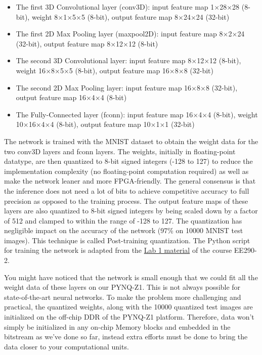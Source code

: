 \documentclass[11pt]{article}
\begin{document}
\begin{itemize}
\item The first 3D Convolutional layer (conv3D): input feature map 1$\times$28$\times$28 (8-bit), weight 8$\times$1$\times$5$\times$5 (8-bit), output feature map 8$\times$24$\times$24 (32-bit)
\item The first 2D Max Pooling layer (maxpool2D): input feature map 8$\times$2$\times$24 (32-bit), output feature map 8$\times$12$\times$12 (8-bit)
\item The second 3D Convolutional layer: input feature map 8$\times$12$\times$12 (8-bit), weight 16$\times$8$\times$5$\times$5 (8-bit), output feature map 16$\times$8$\times$8 (32-bit)
\item The second 2D Max Pooling layer: input feature map 16$\times$8$\times$8 (32-bit), output feature map 16$\times$4$\times$4 (8-bit)
\item The Fully-Connected layer (fconn): input feature map 16$\times$4$\times$4 (8-bit), weight 10$\times$16$\times$4$\times$4 (8-bit), output feature map 10$\times$1$\times$1 (32-bit)
\end{itemize}

The network is trained with the MNIST dataset to obtain the weight data for the two conv3D layers and fconn layers. The weights, initially in floating-point datatype, are then quantized to 8-bit signed integers (-128 to 127) to reduce the implementation complexity (no floating-point computation required) as well as make the network leaner and more FPGA-friendly. The general consensus is that the inference does not need a lot of bits to achieve competitive accuracy to full precision as opposed to the training process. The output feature maps of these layers are also quantized to 8-bit signed integers by being scaled down by a factor of 512 and clamped to within the range of -128 to 127. The quantization has negligible impact on the accuracy of the network (97\% on 10000 MNIST test images). This technique is called Post-training quantization. The Python script for training the network is adapted from the \href{https://drive.google.com/file/d/1LBtLjz2pdo6uj-E0aR69-ZGjmR9RBSDU/view}{Lab 1 material} of the course EE290-2.

You might have noticed that the network is small enough that we could fit all the weight data of these layers on our PYNQ-Z1. This is not always possible for state-of-the-art neural networks. To make the problem more challenging and practical, the quantized weights, along with the 10000 quantized test images are initialized on the off-chip DDR of the PYNQ-Z1 platform. Therefore, data won't simply be initialized in any on-chip Memory blocks and embedded in the bitstream as we've done so far, instead extra efforts must be done to bring the data closer to your computational units.
\end{document}
